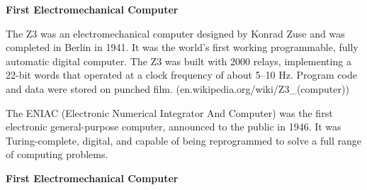 \documentclass[12pt, ]{article}
\begin{document}
\vspace*{2em}
\noindent \textbf{First Electromechanical Computer}

The Z3 was an electromechanical computer designed by Konrad Zuse and was completed in Berlin in 1941. It was the world's first working programmable, fully automatic digital computer. The Z3 was built with 2000 relays, implementing a 22-bit words that operated at a clock frequency of about 5–10 Hz. Program code and data were stored on punched film. (en.wikipedia.org/wiki/Z3\_(computer))

The ENIAC (Electronic Numerical Integrator And Computer) was the first electronic general-purpose computer, announced to the public in 1946. It was Turing-complete, digital, and capable of being reprogrammed to solve a full range of computing problems.

\vspace*{2em}
\noindent \textbf{First Electromechanical Computer}
\end{document}
